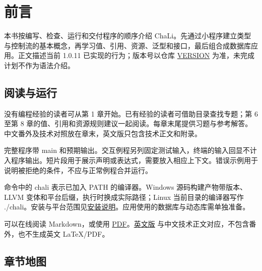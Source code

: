 \chapter*{前\hspace{1em}言}
\label{ch:preface}

本书按编写、检查、运行和交付程序的顺序介绍 ChaLi。先通过小程序建立类型与控制流的基本概念，再学习值、引用、资源、泛型和接口，最后组合成数据库应用。正文描述当前 1.0.11 已实现的行为；版本号以仓库 \href{https://github.com/rabbitc999/ChaLi/blob/master/VERSION}{VERSION} 为准，未完成计划不作为语法介绍。

\section*{阅读与运行}

没有编程经验的读者可从第 1 章开始。已有经验的读者可借助目录查找专题；第 6 至第 8 章的值、引用和资源规则建议一起阅读。每章末尾提供习题与参考解答。中文番外及技术对照放在章末，英文版只包含技术正文和附录。

完整程序带 main 和预期输出。交互例程另列固定测试输入，终端的输入回显不计入程序输出。短片段用于展示声明或表达式，需要放入相应上下文。错误示例用于说明被拒绝的条件，不应与正常例程合并运行。

命令中的 chali 表示已加入 PATH 的编译器。Windows 源码构建产物带版本、LLVM 变体和平台后缀，执行时换成实际路径；Linux 当前目录的编译器写作 ./chali。安装与平台范围见\href{https://github.com/rabbitc999/ChaLi/blob/master/doc/39-installation-packages.md}{安装说明}。应用使用的数据库与动态库需单独准备。

可以在线阅读 Markdown，或使用 \href{https://github.com/rabbitc999/ChaLi/blob/master/doc/book/latex/book.pdf}{PDF}。\href{https://github.com/rabbitc999/ChaLi/blob/master/doc/book/en/README.md}{英文版} 与中文技术正文对应，不包含番外，也不生成英文 LaTeX/PDF。

\section*{章节地图}

